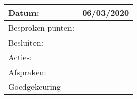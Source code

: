 \begin{tabularx}{\textwidth}{| l | X |}
  \hline
  Datum: & 06/03/2020\\
  \hline
  Besproken punten: & \\
  \hline
  Besluiten: & \\
  Acties: & \\
  Afspraken: & \\
  \hline
  Goedgekeuring & \\
  \hline
\end{tabularx}